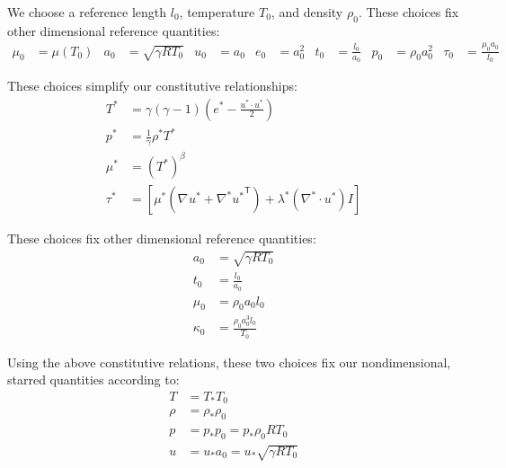 \documentclass[letterpaper,11pt,nointlimits,reqno]{amsart}
\newcommand{\trans}[1]{{#1}^{\ensuremath{\mathsf{T}}}}
\begin{document}
We choose a reference length $l_{0}$, temperature $T_{0}$, and density
$\rho_{0}$.  These choices fix other dimensional reference quantities:
\begin{align*}
  \mu_{0} & = \mu\left( T_{0} \right)
  &
  a_{0} &= \sqrt{\gamma{}RT_{0}}
  &
  u_{0} &= a_{0}
  &
  e_{0} &= a_{0}^{2}
  &
  t_{0} &= \frac{l_{0}}{a_{0}}
  &
  p_{0} &= \rho_{0} a_{0}^{2}
  &
  \tau_{0} &= \frac{\mu_{0}a_{0}}{l_{0}}
\end{align*}

These choices simplify our constitutive relationships:
\begin{align}
  T^{*} &= \gamma \left( \gamma-1 \right) 
           \left( e^{*} - \frac{u^{*}\cdot{}u^{*}}{2} \right)
  \\
  p^{*} &= \frac{1}{\gamma} \rho^{*} T^{*}
  \\
  \mu^{*} &= \left( T^{*} \right)^{\beta} 
  \\
  \tau^{*} &= \left[ 
      \mu^{*} \left( \nabla^{}u^{*} + \trans{\nabla^{*}u^{*}} \right) 
      + \lambda^{*} \left( \nabla^{*}\cdot{}u^{*} \right) I
    \right]
\end{align}


These choices fix other dimensional
reference quantities:
\begin{align*}
  a_{0} &= \sqrt{\gamma{}RT_{0}}
  \\
  t_{0} &= \frac{l_{0}}{a_{0}}
  \\
  \mu_{0} &= \rho_{0} a_{0} l_{0}
  \\
  \kappa_{0} &= \frac{\rho_{0} a_{0}^{3} l_{0}}{T_{0}}
\end{align*}

Using the above constitutive relations, these two choices fix our
nondimensional, starred quantities according to:
\begin{align}
  T &= T_{*} T_{0}
  \\
  \rho &= \rho_{*} \rho_{0}
  \\
  p &= p_{*} p_{0} = p_{*} \rho_{0} R T_{0}
  \\
  u &= u_{*} a_{0} = u_{*} \sqrt{\gamma{}RT_{0}}
  \label{eq:refquantities}
\end{align}
\end{document}
